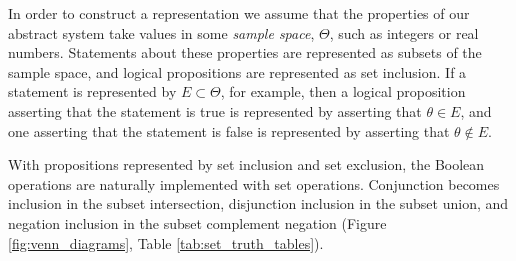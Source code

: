 In order to construct a representation we assume that the properties
of our abstract system take values in some \emph{sample space}, 
$\Theta$, such as integers or real numbers.  Statements about these
properties are represented as subsets of the sample space, and
logical propositions are represented as set inclusion.  If a statement
is represented by $E \subset \Theta$, for example, then a logical
proposition asserting that the statement is true is represented by 
asserting that $\theta \in E$, and one asserting that the statement
is false is represented by asserting that $\theta \notin E$.

With propositions represented by set inclusion and set exclusion,
the Boolean operations are naturally implemented with set operations.  
Conjunction becomes inclusion in the subset intersection, disjunction 
inclusion in the subset union, and negation inclusion in the subset 
complement negation (Figure \ref{fig:venn_diagrams}, 
Table \ref{tab:set_truth_tables}).  

